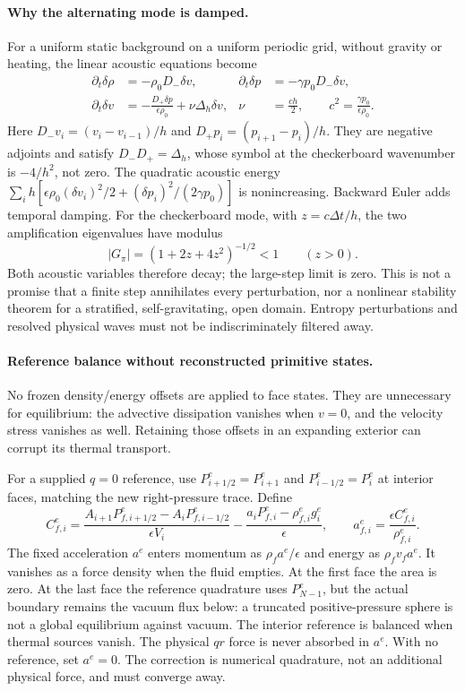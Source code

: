 \documentclass[11pt]{article}
\begin{document}
\paragraph{Why the alternating mode is damped.}
For a uniform static background on a uniform periodic grid, without
gravity or heating, the linear acoustic equations become
\begin{align}
 \partial_t\delta\rho&=-\rho_0D_-\delta v,&
 \partial_t\delta p&=-\gamma p_0D_-\delta v,\\
 \partial_t\delta v&=-\frac{D_+\delta p}{\epsilon\rho_0}
                  +\nu\Delta_h\delta v,&
 \nu&=\frac{ch}{2},\qquad c^2=\frac{\gamma p_0}{\epsilon\rho_0}.
\end{align}
Here $D_-v_i=(v_i-v_{i-1})/h$ and $D_+p_i=(p_{i+1}-p_i)/h$.
They are negative adjoints and satisfy $D_-D_+=\Delta_h$, whose
symbol at the checkerboard wavenumber is $-4/h^2$, not zero.
The quadratic acoustic energy
$\sum_i h[\epsilon\rho_0(\delta v_i)^2/2+
(\delta p_i)^2/(2\gamma p_0)]$ is nonincreasing. Backward Euler adds
temporal damping. For the checkerboard mode, with $z=c\Delta t/h$,
the two amplification eigenvalues have modulus
\begin{equation}
 |G_\pi|=(1+2z+4z^2)^{-1/2}<1\qquad(z>0).
\end{equation}
Both acoustic variables therefore decay; the large-step limit is zero.
This is not a promise that a finite step annihilates every perturbation,
nor a nonlinear stability theorem for a stratified, self-gravitating,
open domain. Entropy perturbations and resolved physical waves must not
be indiscriminately filtered away.

\paragraph{Reference balance without reconstructed primitive states.}
No frozen density/energy offsets are applied to face states. They are
unnecessary for equilibrium: the advective dissipation vanishes when
$v=0$, and the velocity stress vanishes as well. Retaining those offsets
in an expanding exterior can corrupt its thermal transport.

For a supplied $q=0$ reference, use $P^e_{i+1/2}=P^e_{i+1}$ and
$P^e_{i-1/2}=P^e_i$ at interior faces, matching the new right-pressure
trace. Define
\begin{equation}
 C^e_{f,i}=\frac{A_{i+1}P^e_{f,i+1/2}-A_iP^e_{f,i-1/2}}{\epsilon V_i}
 -\frac{a_iP^e_{f,i}-\rho^e_{f,i}g_i^e}{\epsilon},
 \qquad a^e_{f,i}=\frac{\epsilon C^e_{f,i}}{\rho^e_{f,i}}.
 \label{eq:wb}
\end{equation}
The fixed acceleration $a^e$ enters momentum as $\rho_fa^e/\epsilon$
and energy as $\rho_fv_fa^e$. It vanishes as a force density when the
fluid empties. At the first face the area is zero. At the last face the
reference quadrature uses $P^e_{N-1}$, but the actual boundary remains
the vacuum flux below: a truncated positive-pressure sphere is not a
global equilibrium against vacuum. The interior reference is balanced
when thermal sources vanish. The physical $qr$ force is never absorbed
in $a^e$. With no reference, set $a^e=0$. The correction is numerical
quadrature, not an additional physical force, and must converge away.
\end{document}
